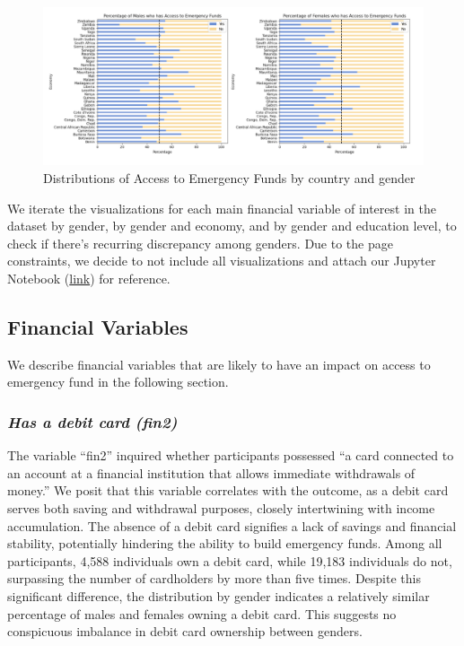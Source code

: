 \documentclass[12pt]{article}
\begin{document}
\begin{figure}

{\centering \includegraphics[width=1\linewidth]{graphs/country_graph10} 

}

\caption{Distributions of Access to Emergency Funds by country and gender}\label{fig:unnamed-chunk-13}
\end{figure}

We iterate the visualizations for each main financial variable of
interest in the dataset by gender, by gender and economy, and by gender
and education level, to check if there's recurring discrepancy among
genders. Due to the page constraints, we decide to not include all
visualizations and attach our Jupyter Notebook
(\href{https://drive.google.com/file/d/1f9AauOn4I2Rl5io_viMw0WbEXKFiJcRA/view?usp=sharing}{link})
for reference.

\hypertarget{financial-variables}{%
\subsection{Financial Variables}\label{financial-variables}}

We describe financial variables that are likely to have an impact on
access to emergency fund in the following section.

\hypertarget{has-a-debit-card-fin2}{%
\subsubsection{\texorpdfstring{\emph{Has a debit card
(fin2)}}{Has a debit card (fin2)}}\label{has-a-debit-card-fin2}}

The variable ``fin2'' inquired whether participants possessed ``a card
connected to an account at a financial institution that allows immediate
withdrawals of money.'' We posit that this variable correlates with the
outcome, as a debit card serves both saving and withdrawal purposes,
closely intertwining with income accumulation. The absence of a debit
card signifies a lack of savings and financial stability, potentially
hindering the ability to build emergency funds. Among all participants,
4,588 individuals own a debit card, while 19,183 individuals do not,
surpassing the number of cardholders by more than five times. Despite
this significant difference, the distribution by gender indicates a
relatively similar percentage of males and females owning a debit card.
This suggests no conspicuous imbalance in debit card ownership between
genders.
\end{document}
